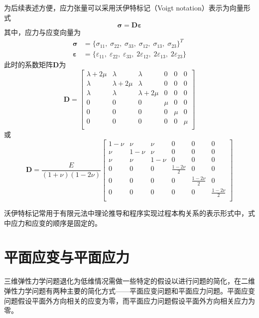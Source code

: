 为后续表述方便，应力张量可以采用沃伊特标记（Voigt notation）表示为向量形式
\begin{equation}\label{ch_elasticity:constitutive}
\boldsymbol \sigma = \boldsymbol D \boldsymbol \varepsilon
\end{equation}
其中，应力与应变向量为
\begin{subequations}
\begin{align}
\boldsymbol \sigma &= 
\{\sigma_{11},\; \sigma_{22},\; \sigma_{33},\; \sigma_{12},\; \sigma_{13},\; \sigma_{23}\}^T \\
\boldsymbol \varepsilon &=
\{\varepsilon_{11},\; \varepsilon_{22},\; \varepsilon_{33},\; 2\varepsilon_{12},\; 2\varepsilon_{13},\; 2\varepsilon_{23}\}
\end{align}
\end{subequations}
此时的系数矩阵$\boldsymbol D$为
\begin{equation}
\boldsymbol D =
\begin{bmatrix}
    \lambda + 2\mu & \lambda & \lambda & 0 & 0 & 0 \\
    \lambda & \lambda + 2\mu & \lambda & 0 & 0 & 0 \\
    \lambda & \lambda & \lambda + 2\mu & 0 & 0 & 0 \\
    0 & 0 & 0 & \mu & 0 & 0 \\
    0 & 0 & 0 & 0 & \mu & 0 \\
    0 & 0 & 0 & 0 & 0 & \mu \\
\end{bmatrix}
\end{equation}
或
\begin{equation}
\boldsymbol D = \frac{E}{(1+\nu)(1-2\nu)}
\begin{bmatrix}
    1-\nu & \nu & \nu & 0 & 0 & 0 \\
    \nu & 1-\nu & \nu & 0 & 0 & 0 \\
    \nu & \nu & 1-\nu & 0 & 0 & 0 \\
    0 & 0 & 0 & \frac{1-2\nu}{2} & 0 & 0 \\
    0 & 0 & 0 & 0 & \frac{1-2\nu}{2} & 0 \\
    0 & 0 & 0 & 0 & 0 & \frac{1-2\nu}{2} \\
\end{bmatrix}
\end{equation}\par
沃伊特标记常用于有限元法中理论推导和程序实现过程本构关系的表示形式中，式中应力和应变的顺序是固定的。

\section{平面应变与平面应力}
三维弹性力学问题退化为低维情况需做一些特定的假设以进行问题的简化，在二维弹性力学问题有两种主要的简化方式——平面应变问题和平面应力问题。平面应变问题假设平面外方向相关的应变为零，而平面应力问题假设平面外方向相关应力为零。
